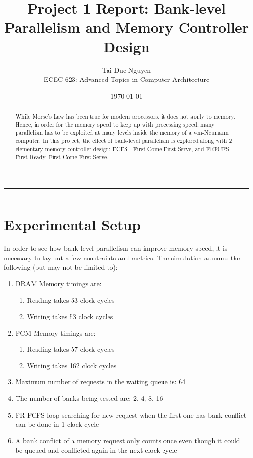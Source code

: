 \documentclass[letterpaper, 11pt]{article}
\title{Project 1 Report: Bank-level Parallelism and Memory Controller Design}
\author{
Tai Duc Nguyen \\
ECEC 623: Advanced Topics in Computer Architecture
}
\date{\today}
\begin{document}
\maketitle




\rule{\textwidth}{1pt}

\begin{abstract}
	While Morse's Law has been true for modern processors, it does not apply to memory. Hence, in order for the memory speed to keep up with processing speed, many parallelism has to be exploited at many levels inside the memory of a von-Neumann computer. In this project, the effect of bank-level parallelism is explored along with 2 elementary memory controller design: FCFS - First Come First Serve, and FRFCFS - First Ready, First Come First Serve. 
\end{abstract}

\rule{\textwidth}{1pt}

\section{Experimental Setup}

In order to see how bank-level parallelism can improve memory speed, it is necessary to lay out a few constraints and metrics. The simulation assumes the following (but may not be limited to):
\begin{enumerate}
	\item DRAM Memory timings are:
	\begin{enumerate}
		\item Reading takes 53 clock cycles
		\item Writing takes 53 clock cycles
	\end{enumerate}
	\item PCM Memory timings are:
	\begin{enumerate}
		\item Reading takes 57 clock cycles
		\item Writing takes 162 clock cycles
	\end{enumerate}
	\item Maximum number of requests in the waiting queue is: 64
	\item The number of banks being tested are: 2, 4, 8, 16
	\item FR-FCFS loop searching for new request when the first one has bank-conflict can be done in 1 clock cycle
	\item A bank conflict of a memory request only counts once even though it could be queued and conflicted again in the next clock cycle
\end{enumerate}
\end{document}
